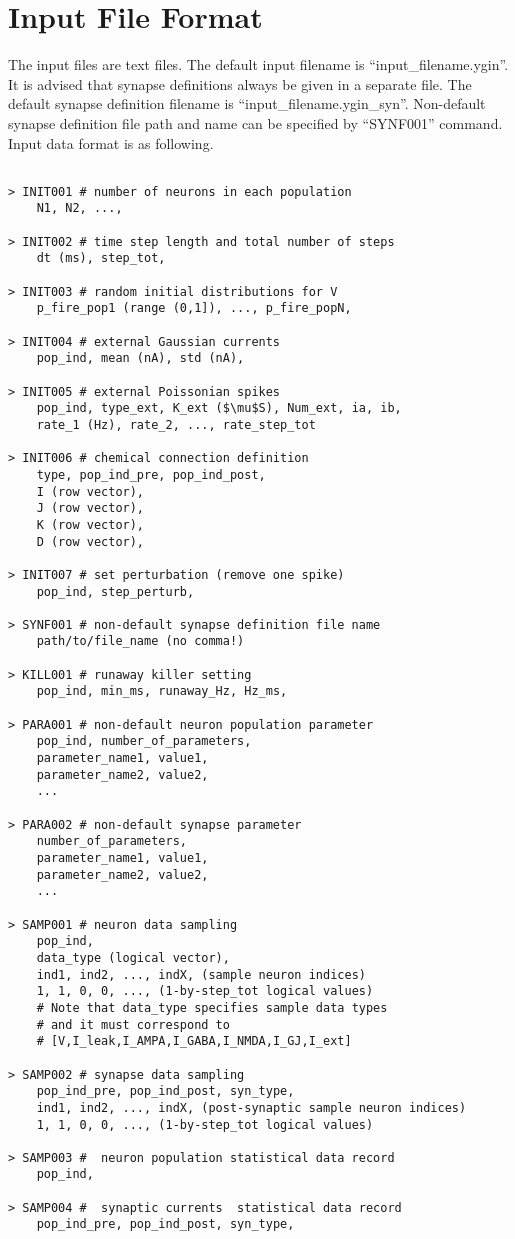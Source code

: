 \documentclass{article}
\begin{document}
\section{Input File Format}

The input files are text files.
The default input filename is ``input\_filename.ygin''.
It is advised that synapse definitions always be given in a separate file.
The default synapse definition filename is ``input\_filename.ygin\_syn''.
Non-default synapse definition file path and name can be specified by ``SYNF001'' command.
Input data format is as following.




\begin{lstlisting}[mathescape]

> INIT001 # number of neurons in each population
	N1, N2, ...,

> INIT002 # time step length and total number of steps
	dt (ms), step_tot,

> INIT003 # random initial distributions for V
	p_fire_pop1 (range (0,1]), ..., p_fire_popN, 

> INIT004 # external Gaussian currents
	pop_ind, mean (nA), std (nA), 

> INIT005 # external Poissonian spikes
	pop_ind, type_ext, K_ext ($\mu$S), Num_ext, ia, ib,
	rate_1 (Hz), rate_2, ..., rate_step_tot

> INIT006 # chemical connection definition
	type, pop_ind_pre, pop_ind_post,
	I (row vector),
	J (row vector),
	K (row vector),
	D (row vector),

> INIT007 # set perturbation (remove one spike)
	pop_ind, step_perturb,

> SYNF001 # non-default synapse definition file name
	path/to/file_name (no comma!)

> KILL001 # runaway killer setting
	pop_ind, min_ms, runaway_Hz, Hz_ms,

> PARA001 # non-default neuron population parameter
	pop_ind, number_of_parameters,
	parameter_name1, value1,
	parameter_name2, value2,
	...
 
> PARA002 # non-default synapse parameter
	number_of_parameters,
	parameter_name1, value1,
	parameter_name2, value2,
	...

> SAMP001 # neuron data sampling 
	pop_ind,
	data_type (logical vector),
	ind1, ind2, ..., indX, (sample neuron indices)
	1, 1, 0, 0, ..., (1-by-step_tot logical values)
	# Note that data_type specifies sample data types
	# and it must correspond to 
	# [V,I_leak,I_AMPA,I_GABA,I_NMDA,I_GJ,I_ext]

> SAMP002 # synapse data sampling 
	pop_ind_pre, pop_ind_post, syn_type,
	ind1, ind2, ..., indX, (post-synaptic sample neuron indices)
	1, 1, 0, 0, ..., (1-by-step_tot logical values)
	
> SAMP003 #  neuron population statistical data record
	pop_ind,
	
> SAMP004 #  synaptic currents  statistical data record
	pop_ind_pre, pop_ind_post, syn_type,

\end{lstlisting}
\end{document}
